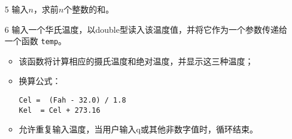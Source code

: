 \begin{frame}[fragile]\ft{\secname}
\begin{itemize}
\item[5] 输入$n$，求前$n$个整数的和。
\end{itemize}
\end{frame}

\begin{frame}[fragile]\ft{\secname}
\begin{itemize}
\item[6] 输入一个华氏温度，以double型读入该温度值，并将它作为一个参数传递给一个函数 \lstinline|temp|。\\[.1in]
  \begin{itemize}
  \item 该函数将计算相应的摄氏温度和绝对温度，并显示这三种温度；\\[.1in]
  \item 换算公式：
\begin{lstlisting}
Cel =  (Fah - 32.0) / 1.8 
Kel  = Cel + 273.16
\end{lstlisting}
\item
  允许重复输入温度，当用户输入q或其他非数字值时，循环结束。
\end{itemize}
\end{itemize}
\end{frame}
